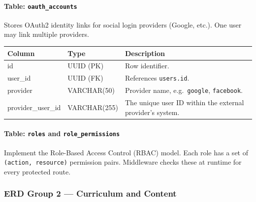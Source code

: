 \paragraph{Table: \texttt{oauth\_accounts}}
Stores OAuth2 identity links for social login providers (Google, etc.). One user may link multiple providers.

\begin{longtable}{|p{4.2cm}|p{3cm}|p{6.8cm}|}
\hline \textbf{Column} & \textbf{Type} & \textbf{Description} \\ \hline
id & UUID (PK) & Row identifier. \\ \hline
user\_id & UUID (FK) & References \texttt{users.id}. \\ \hline
provider & VARCHAR(50) & Provider name, e.g.\ \texttt{google}, \texttt{facebook}. \\ \hline
provider\_user\_id & VARCHAR(255) & The unique user ID within the external provider's system. \\ \hline
\end{longtable}

\paragraph{Table: \texttt{roles} and \texttt{role\_permissions}}
Implement the Role-Based Access Control (RBAC) model. Each role has a set of \texttt{(action, resource)} permission pairs. Middleware checks these at runtime for every protected route.

\subsubsection{ERD Group 2 --- Curriculum and Content}

